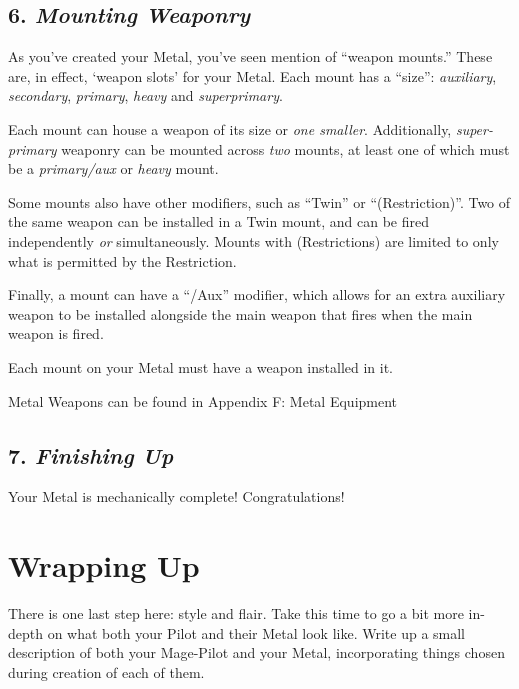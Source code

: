 \documentclass[
]{article}
\begin{document}
\hypertarget{mounting-weaponry}{%
\subsection{\texorpdfstring{6. \emph{Mounting
Weaponry}}{6. Mounting Weaponry}}\label{mounting-weaponry}}

As you've created your Metal, you've seen mention of ``weapon mounts.''
These are, in effect, `weapon slots' for your Metal. Each mount has a
``size'': \emph{auxiliary}, \emph{secondary}, \emph{primary},
\emph{heavy} and \emph{superprimary}.

Each mount can house a weapon of its size or \emph{one smaller}.
Additionally, \emph{super-primary} weaponry can be mounted across
\emph{two} mounts, at least one of which must be a \emph{primary/aux} or
\emph{heavy} mount.

Some mounts also have other modifiers, such as ``Twin'' or
``(Restriction)''. Two of the same weapon can be installed in a Twin
mount, and can be fired independently \emph{or} simultaneously. Mounts
with (Restrictions) are limited to only what is permitted by the
Restriction.

Finally, a mount can have a ``/Aux'' modifier, which allows for an extra
auxiliary weapon to be installed alongside the main weapon that fires
when the main weapon is fired.

Each mount on your Metal must have a weapon installed in it.

Metal Weapons can be found in Appendix F: Metal Equipment

\hypertarget{finishing-up-1}{%
\subsection{\texorpdfstring{7. \emph{Finishing
Up}}{7. Finishing Up}}\label{finishing-up-1}}

Your Metal is mechanically complete! Congratulations!

\hypertarget{wrapping-up}{%
\section{Wrapping Up}\label{wrapping-up}}

There is one last step here: style and flair. Take this time to go a bit
more in-depth on what both your Pilot and their Metal look like. Write
up a small description of both your Mage-Pilot and your Metal,
incorporating things chosen during creation of each of them.
\end{document}

